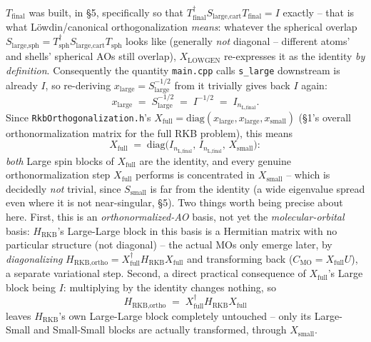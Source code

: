 \documentclass[11pt]{article}
\begin{document}
$T_{\text{final}}$ was built, in \S5, specifically so that $T_{\text{final}}^{\dagger}S_{\text{large,cart}}T_{\text{final}}=I$
exactly -- that is what Löwdin/canonical orthogonalization \emph{means}: whatever the spherical
overlap $S_{\text{large,sph}}=T_{\text{sph}}^{\dagger}S_{\text{large,cart}}T_{\text{sph}}$ looks like
(generally \emph{not} diagonal -- different atoms' and shells' spherical AOs still overlap),
$X_{\text{LOWGEN}}$ re-expresses it as the identity \emph{by definition}. Consequently the quantity
\texttt{main.cpp} calls \texttt{s\_large} downstream is already $I$, so re-deriving
$x_{\text{large}}=S_{\text{large}}^{-1/2}$ from it trivially gives back $I$ again:
\begin{equation}
x_{\text{large}} \;=\; S_{\text{large}}^{-1/2} \;=\; I^{-1/2} \;=\; I_{n_{\text{L,final}}}.
\end{equation}
Since \texttt{RkbOrthogonalization.h}'s $X_{\text{full}}=\mathrm{diag}(x_{\text{large}},x_{\text{large}},x_{\text{small}})$
(\S1's overall orthonormalization matrix for the full RKB problem), this means
\begin{equation}
X_{\text{full}} \;=\; \mathrm{diag}\big(I_{n_{\text{L,final}}},\,I_{n_{\text{L,final}}},\,X_{\text{small}}\big):
\end{equation}
\emph{both} Large spin blocks of $X_{\text{full}}$ are the identity, and every genuine
orthonormalization step $X_{\text{full}}$ performs is concentrated in $X_{\text{small}}$ -- which is
decidedly \emph{not} trivial, since $S_{\text{small}}$ is far from the identity (a wide eigenvalue
spread even where it is not near-singular, \S5). Two things worth being precise about here. First,
this is an \emph{orthonormalized-AO} basis, not yet the \emph{molecular-orbital} basis: $H_{\text{RKB}}$'s
Large-Large block in this basis is a Hermitian matrix with no particular structure (not diagonal) --
the actual MOs only emerge later, by \emph{diagonalizing}
$H_{\text{RKB,ortho}}=X_{\text{full}}^{\dagger}H_{\text{RKB}}X_{\text{full}}$ and transforming back
($C_{\text{MO}}=X_{\text{full}}U$), a separate variational step. Second, a direct practical
consequence of $X_{\text{full}}$'s Large block being $I$: multiplying by the identity changes
nothing, so
\begin{equation}
H_{\text{RKB,ortho}} \;=\; X_{\text{full}}^{\dagger}H_{\text{RKB}}X_{\text{full}}
\end{equation}
leaves $H_{\text{RKB}}$'s own Large-Large block completely untouched -- only its Large-Small and
Small-Small blocks are actually transformed, through $X_{\text{small}}$.
\end{document}
